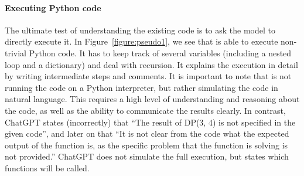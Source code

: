 \paragraph{Executing Python code} The ultimate test of understanding the existing code is to ask the model to directly execute it. 
In Figure~\ref{figure:pseudo1}, we see that \DV{} is able to execute non-trivial Python code. It has to keep track of several variables (including a nested loop and a dictionary) and deal with recursion. It explains the execution in detail by writing intermediate steps and comments. It is important to note that \DV{} is not running the code on a Python interpreter, but rather simulating the code in natural language. This requires a high level of understanding and reasoning about the code, as well as the ability to communicate the results clearly. In contrast, ChatGPT states (incorrectly) that ``The result of DP(3, 4) is not specified in the given code'', and later on that ``It is not clear from the code what the expected output of the function is, as the specific problem that the function is solving is not provided.'' ChatGPT does not simulate the full execution, but states which functions will be called. %
